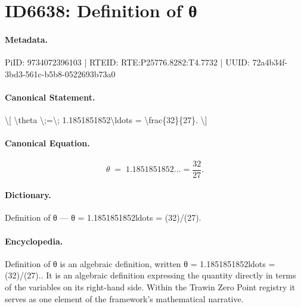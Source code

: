 \section*{ID6638: Definition of θ}
\paragraph{Metadata.}
PiID: 9734072396103 | RTEID: RTE:P25776.8282:T4.7732 | UUID: 72a4b34f-3bd3-561c-b5b8-0522693b73a0

\paragraph{Canonical Statement.}
\textbackslash{}[ \textbackslash{}theta \textbackslash{};=\textbackslash{}; 1.1851851852\textbackslash{}ldots = \textbackslash{}frac\{32\}\{27\}. \textbackslash{}]

\paragraph{Canonical Equation.}
\[
\theta \;=\; 1.1851851852\ldots = \frac{32}{27}.
\]

\paragraph{Dictionary.}
Definition of θ — θ = 1.1851851852ldots = (32)/(27).

\paragraph{Encyclopedia.}
Definition of θ is an algebraic definition, written θ = 1.1851851852ldots = (32)/(27).. It is an algebraic definition expressing the quantity directly in terms of the variables on its right-hand side. Within the Trawin Zero Point registry it serves as one element of the framework's mathematical narrative.
